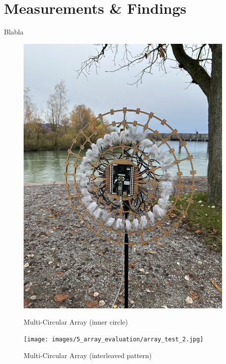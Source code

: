 \newpage
\section{Measurements \& Findings} \label{sec:array_prototype_measurements}
Blabla



\begin{figure}[h!]
	\centering
	\begin{minipage}{0.49\textwidth}
		\centering
		\includegraphics[width=0.95\textwidth]{images/5_array_evaluation/array_test_1.jpg}
		\caption{Multi-Circular Array (inner circle)}
		\label{fig:array_test_1}
	\end{minipage}
	\begin{minipage}{0.49\textwidth}
		\centering
		\texttt{[image: images/5\_array\_evaluation/array\_test\_2.jpg]}
		\caption{Multi-Circular Array (interleaved  pattern)}
		\label{fig:array_test_2}
	\end{minipage}
\end{figure}

